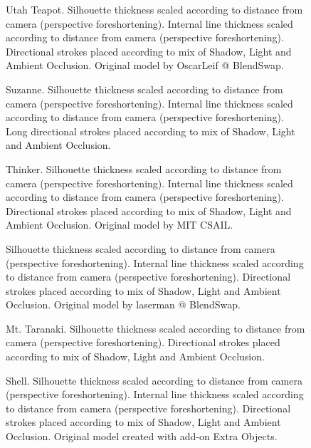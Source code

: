 \begin{figure}[h!]
	\centering
	
	\caption{Utah Teapot. Silhouette thickness scaled according to distance from camera (perspective foreshortening). Internal line thickness scaled according to distance from camera (perspective foreshortening). Directional strokes placed according to mix of Shadow, Light and Ambient Occlusion.  Original model by OscarLeif @ BlendSwap.}\label{render_teapot}
\end{figure}

\begin{figure}[h!]
	\centering
	
	\caption{Suzanne. Silhouette thickness scaled according to distance from camera (perspective foreshortening). Internal line thickness scaled according to distance from camera (perspective foreshortening). Long directional strokes placed according to mix of Shadow, Light and Ambient Occlusion.}\label{render_suzanne}
\end{figure}

\begin{figure}[h!]
	\centering
	
	\caption{Thinker. Silhouette thickness scaled according to distance from camera (perspective foreshortening). Internal line thickness scaled according to distance from camera (perspective foreshortening). Directional strokes placed according to mix of Shadow, Light and Ambient Occlusion. Original model by MIT CSAIL.}\label{render_thinker}
\end{figure}

\begin{figure}[h!]
	\centering
	
	\caption{Silhouette thickness scaled according to distance from camera (perspective foreshortening). Internal line thickness scaled according to distance from camera (perspective foreshortening). Directional strokes placed according to mix of Shadow, Light and Ambient Occlusion. Original model by laserman @ BlendSwap.}\label{render_brooklyn}
\end{figure}

\begin{figure}[h!]
	\centering
	
	\caption{Mt. Taranaki. Silhouette thickness scaled according to distance from camera (perspective foreshortening). Directional strokes placed according to mix of Shadow, Light and Ambient Occlusion.}\label{render_taranaki}
\end{figure}

\begin{figure}[h!]
	\centering
	
	\caption{Shell. Silhouette thickness scaled according to distance from camera (perspective foreshortening). Internal line thickness scaled according to distance from camera (perspective foreshortening). Directional strokes placed according to mix of Shadow, Light and Ambient Occlusion. Original model created with add-on Extra Objects.}\label{render_shell}
\end{figure}